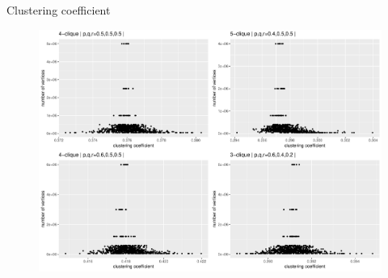 \begin{block}{Clustering coefficient}
\begin{figure}
\includegraphics[width=0.8\linewidth]{./fig/klikkclust4.pdf}
\end{figure}
\end{block}
